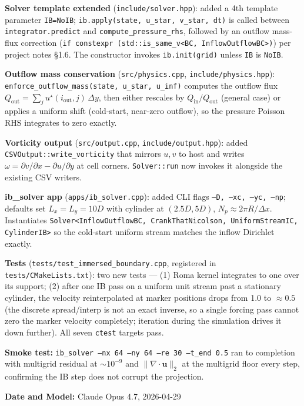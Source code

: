 \textbf{Solver template extended} (\texttt{include/solver.hpp}): added a 4th template parameter \texttt{IB=NoIB}; \texttt{ib.apply(state, u\_star, v\_star, dt)} is called between \texttt{integrator.predict} and \texttt{compute\_pressure\_rhs}, followed by an outflow mass-flux correction (\texttt{if constexpr (std::is\_same\_v<BC, InflowOutflowBC>)}) per project notes \S1.6. The constructor invokes \texttt{ib.init(grid)} unless \texttt{IB} is \texttt{NoIB}.

\textbf{Outflow mass conservation} (\texttt{src/physics.cpp}, \texttt{include/physics.hpp}): \texttt{enforce\_outflow\_mass(state, u\_star, u\_inf)} computes the outflow flux $Q_\text{out} = \sum_j u^\star(i_\text{out},j)\,\Delta y$, then either rescales by $Q_\text{in}/Q_\text{out}$ (general case) or applies a uniform shift (cold-start, near-zero outflow), so the pressure Poisson RHS integrates to zero exactly.

\textbf{Vorticity output} (\texttt{src/output.cpp}, \texttt{include/output.hpp}): added \texttt{CSVOutput::write\_vorticity} that mirrors $u,v$ to host and writes $\omega = \partial v/\partial x - \partial u/\partial y$ at cell corners. \texttt{Solver::run} now invokes it alongside the existing CSV writers.

\textbf{ib\_solver app} (\texttt{apps/ib\_solver.cpp}): added CLI flags \texttt{--D, --xc, --yc, --np}; defaults set $L_x = L_y = 10D$ with cylinder at $(2.5D, 5D)$, $N_p \approx 2\pi R/\Delta x$. Instantiates \texttt{Solver<InflowOutflowBC, CrankThatNicolson, UniformStreamIC, CylinderIB>} so the cold-start uniform stream matches the inflow Dirichlet exactly.

\textbf{Tests} (\texttt{tests/test\_immersed\_boundary.cpp}, registered in \texttt{tests/CMakeLists.txt}): two new tests --- (1) Roma kernel integrates to one over its support; (2) after one IB pass on a uniform unit stream past a stationary cylinder, the velocity reinterpolated at marker positions drops from 1.0 to ${\approx}0.5$ (the discrete spread/interp is not an exact inverse, so a single forcing pass cannot zero the marker velocity completely; iteration during the simulation drives it down further). All seven \texttt{ctest} targets pass.

\textbf{Smoke test:} \texttt{ib\_solver --nx 64 --ny 64 --re 30 --t\_end 0.5} ran to completion with multigrid residual at ${\sim}10^{-9}$ and $\|\nabla\cdot\mathbf{u}\|_2$ at the multigrid floor every step, confirming the IB step does not corrupt the projection.

\textbf{Date and Model:} Claude Opus 4.7, 2026-04-29
